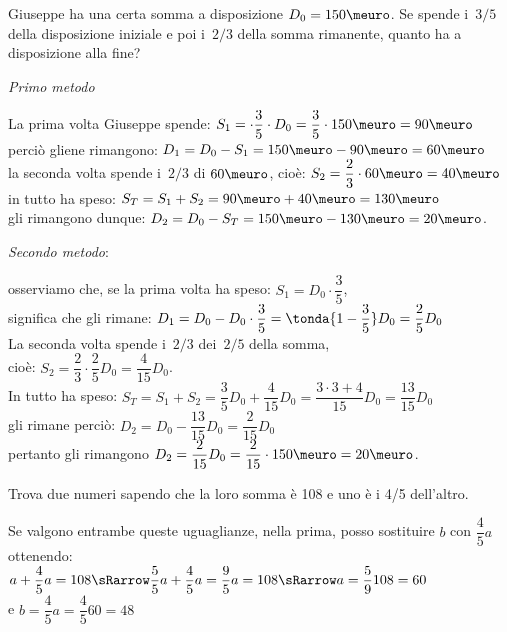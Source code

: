 \begin{esempio}{}{}
Giuseppe ha una certa somma a disposizione \(D_0 = 150\meuro\). 
Se spende i~\(3/5\) della disposizione 
iniziale e poi i~\(2/3\) della somma rimanente, 
quanto ha a disposizione alla fine?

\vspace{.5em}
\emph{Primo metodo} 

La prima volta Giuseppe spende: \quad 
\(S_1 = \cdot \dfrac{3}{5} \cdot D_0 = 
  \dfrac{3}{5} \cdot 150\meuro = 90\meuro\)\\
perciò gliene rimangono: \quad 
\(D_1 = D_0 - S_1 = 150\meuro - 90\meuro = 60\meuro\) \\
la seconda volta spende i~\(2/3\) di \(60\meuro\), 
cioè: \quad \(S_2 = \dfrac{2}{3} \cdot 60\meuro = 40\meuro\) \\
in tutto ha speso: \quad 
\(S_T = S_1 + S_2 = 90\meuro + 40\meuro = 130\meuro\)\\
gli rimangono dunque: \quad 
\(D_2 = D_0 - S_T = 150\meuro - 130\meuro = 20\meuro\).

\vspace{.5em}
\emph{Secondo metodo}: 

osserviamo che,
se la prima volta ha speso: \quad 
\(S_1 = D_0 \cdot \dfrac{3}{5}\),\\
significa che gli rimane: \quad 
\(D_1 = D_0 - D_0 \cdot \dfrac{3}{5} = 
  \tonda{1-\dfrac{3}{5}} D_0 = \dfrac{2}{5} D_0\) \\ 
La seconda volta spende i~\({2}/{3}\) dei~\({2}/{5}\) della somma, \\
cioè: \quad 
\(S_2 = \dfrac{2}{3} \cdot \dfrac{2}{5} D_0 = \dfrac{4}{15} D_0\).\\
In tutto ha speso: \quad 
\(S_T = S_1 + S_2 = \dfrac{3}{5} D_0 + \dfrac{4}{15} D_0 =
  \dfrac{3\cdot3+4}{15} D_0 =\dfrac{13}{15} D_0\) \\
gli rimane perciò: \quad 
\(D_2 = D_0 - \dfrac{13}{15} D_0 = \dfrac{2}{15} D_0\) \\ 
pertanto gli rimangono \quad 
\(D_2 = \dfrac{2}{15} D_0 = \dfrac{2}{15} \cdot 150\meuro= 20 \meuro\).
\end{esempio}

\begin{esempio}{}{}
Trova due numeri sapendo che la loro somma è 108 e uno è i 4/5 dell'altro.

\vspace{.5em}
\vspace{.5em}
Se valgono entrambe queste uguaglianze, nella prima, posso sostituire \(b\) 
con \(\dfrac{4}{5} a\) ottenendo: \\
\(a + \dfrac{4}{5} a = 108 \sRarrow \dfrac{5}{5} a + \dfrac{4}{5} a = 
  \dfrac{9}{5} a = 108 \sRarrow a = \dfrac{5}{9} 108 = 60\)\\
e \(b = \dfrac{4}{5} a = \dfrac{4}{5} 60 = 48\)
\end{esempio}

